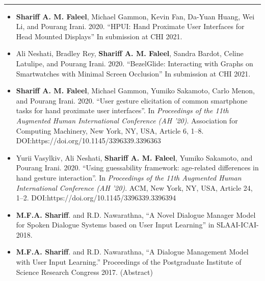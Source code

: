 \documentclass[a4paper,11pt]{article}
\begin{document}
\vspace{10pt}
\noindent
\textbf{\large{}}
\vspace{-8pt}\noindent\\\rule{0.75\textwidth}{0.4pt}
\vspace{-8pt}
\begin{itemize}
  \item[]\textbf{Shariff A. M. Faleel}, Michael Gammon, Kevin Fan, Da-Yuan Huang, Wei Li, and Pourang Irani. 2020. ``HPUI: Hand Proximate User Interfaces for Head Mounted Displays'' In submission at CHI 2021.
  \item[]Ali Neshati, Bradley Rey, \textbf{Shariff A. M. Faleel}, Sandra Bardot, Celine Latulipe, and Pourang Irani. 2020. ``BezelGlide: Interacting with Graphs on Smartwatches with Minimal Screen Occlusion'' In submission at CHI 2021.
  \item[]\textbf{Shariff A. M. Faleel}, Michael Gammon, Yumiko Sakamoto, Carlo Menon, and Pourang Irani. 2020. ``User gesture elicitation of common smartphone tasks for hand proximate user interfaces''. In \textit{Proceedings of the 11th Augmented Human International Conference (AH '20)}. Association for Computing Machinery, New York, NY, USA, Article 6, 1–8. \\DOI:https://doi.org/10.1145/3396339.3396363
  \item[]Yurii Vasylkiv, Ali Neshati, \textbf{Shariff A. M. Faleel}, Yumiko Sakamoto, and Pourang Irani. 2020. ``Using guessability framework: age-related differences in hand gesture interaction''. In \textit{Proceedings of the 11th Augmented Human International Conference (AH '20)}. ACM, New York, NY, USA, Article 24, 1–2. DOI:https://doi.org/10.1145/3396339.3396394
  \item[]\textbf{M.F.A. Shariff}. and R.D. Nawarathna, ``A Novel Dialogue Manager Model for Spoken Dialogue Systems based on User Input Learning'' in SLAAI-ICAI-2018.
  \item[]\textbf{M.F.A. Shariff}. and R.D. Nawarathna, ``A Dialogue Management Model with User Input Learning.'' Proceedings of the Postgraduate Institute of Science Research Congress 2017. (Abstract)
\end{itemize}
\end{document}
